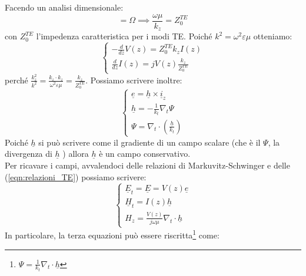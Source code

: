 \documentclass{book}
\begin{document}
        Facendo un analisi dimensionale:
        \begin{equation}
            [\frac{\omega \mu}{k_{z}}] = \Omega \implies \frac{\omega \mu}{k_{z}} = Z_{0} ^{TE}
        \end{equation}
        con $Z_{0} ^{TE}$ l'impedenza caratteristica per i modi TE. Poiché $k^{2}=\omega^{2} \varepsilon \mu$ otteniamo:
        \begin{equation}
            \begin{cases}
            -\frac{d}{dz}V(z) = Z_{0} ^{TE} k_{z}I(z) \\
            \frac{d}{dz}I(z) = j V(z) \displaystyle \frac{k_{z}}{Z_{0} ^{TE}}
            \end{cases}
        \end{equation}
        perché $\displaystyle \frac{k^{2} _{z}}{k ^{2}} = \frac{k_{z} \cdot k_{z}}{\omega ^{2} \varepsilon \mu} = \frac{k_{z}}{Z_{0} ^{TE}}$.
    Possiamo scrivere inoltre:
    \begin{equation}
        \label{eqn:relazioni_TE}
        \begin{cases}
            \displaystyle \underline{e} = \underline{h} \times \underline{i}_{z} \\
            \underline{h} = \displaystyle - \frac{1}{k_{t}}\nabla_{t} \Psi \\
            \Psi = \nabla_{t} \cdot \displaystyle (\frac{\underline{h}}{k_{t}})
        \end{cases}
    \end{equation}
    Poiché $\underline{h}$ si può scrivere come il gradiente di un campo scalare (che è il $\Psi$, la divergenza di $\underline{h}$ ) allora 
    $\underline{h}$ è un campo conservativo. \\
    Per ricavare i campi, avvalendoci delle relazioni di Markuvitz-Schwinger e delle (\ref{eqn:relazioni_TE}) possiamo scrivere:
    \begin{equation}
        \begin{cases}
            \underline{E}_{t} = \underline{E} = V(z)\underline{e} \\
            \underline{H}_{t} = I(z)\underline{h} \\
            H_{z} = \frac{V(z)}{j \omega \mu} \nabla_{t} \cdot \underline{h}
        \end{cases}
    \end{equation}
    In particolare, la terza equazioni può essere riscritta\footnote{$\Psi = \frac{1}{k_{t}}\nabla_{t} \cdot \underline{h}$} come:
\end{document}
